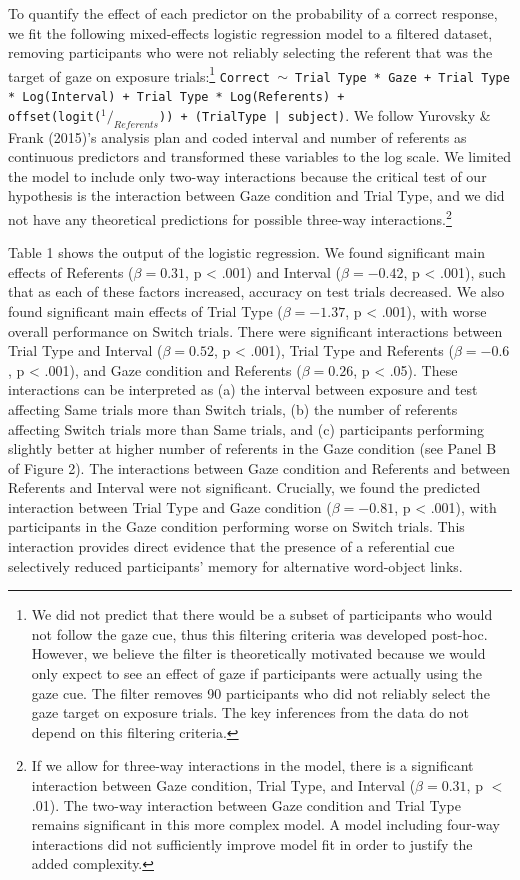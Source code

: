 \documentclass[authoryear, review]{elsarticle}
\begin{document}
To quantify the effect of each predictor on the probability of a correct
response, we fit the following mixed-effects logistic regression model
to a filtered dataset, removing participants who were not reliably
selecting the referent that was the target of gaze on exposure
trials:\footnote{We did not predict that there would be a subset of participants who would not follow the gaze cue, thus this filtering criteria was developed post-hoc. However, we believe the filter is theoretically motivated because we would only expect to see an effect of gaze if participants were actually using the gaze cue. The filter removes 90 participants who did not reliably select the gaze target on exposure trials. The key inferences from the data do not depend on this filtering criteria.}
\texttt{Correct $\sim$ Trial Type * Gaze + Trial Type * Log(Interval) + Trial Type * Log(Referents) + \\ offset(logit($^1/_{Referents}$)) + (TrialType | subject)}.
We follow Yurovsky \& Frank (2015)'s analysis plan and coded interval
and number of referents as continuous predictors and transformed these
variables to the log scale. We limited the model to include only two-way
interactions because the critical test of our hypothesis is the
interaction between Gaze condition and Trial Type, and we did not have
any theoretical predictions for possible three-way
interactions.\footnote{If we allow for three-way interactions in the model, there is a significant interaction between Gaze condition, Trial Type, and Interval ($\beta = 0.31$, p $<$ .01). The two-way interaction between Gaze condition and Trial Type remains significant in this more complex model. A model including four-way interactions did not sufficiently improve model fit in order to justify the added complexity.}

Table 1 shows the output of the logistic regression. We found
significant main effects of Referents (\(\beta = 0.31\), p \textless{}
.001) and Interval (\(\beta = -0.42\), p \textless{} .001), such that as
each of these factors increased, accuracy on test trials decreased. We
also found significant main effects of Trial Type (\(\beta = -1.37\), p
\textless{} .001), with worse overall performance on Switch trials.
There were significant interactions between Trial Type and Interval
(\(\beta = 0.52\), p \textless{} .001), Trial Type and Referents
(\(\beta = -0.6\), p \textless{} .001), and Gaze condition and Referents
(\(\beta = 0.26\), p \textless{} .05). These interactions can be
interpreted as (a) the interval between exposure and test affecting Same
trials more than Switch trials, (b) the number of referents affecting
Switch trials more than Same trials, and (c) participants performing
slightly better at higher number of referents in the Gaze condition (see
Panel B of Figure 2). The interactions between Gaze condition and
Referents and between Referents and Interval were not significant.
Crucially, we found the predicted interaction between Trial Type and
Gaze condition (\(\beta = -0.81\), p \textless{} .001), with
participants in the Gaze condition performing worse on Switch trials.
This interaction provides direct evidence that the presence of a
referential cue selectively reduced participants' memory for alternative
word-object links.
\end{document}
